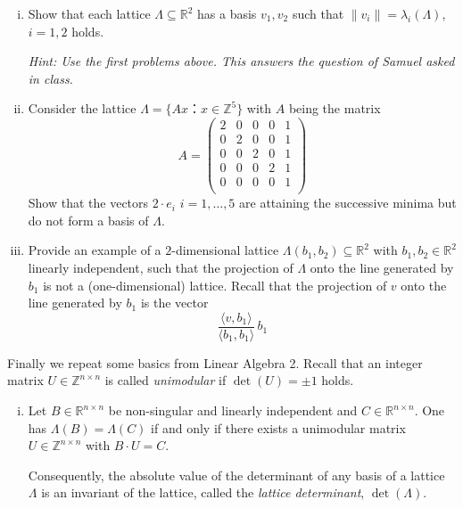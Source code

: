 \documentclass[11pt,a4paper]{article}
\begin{document}
\begin{enumerate}[i)]
  \setcounter{enumi}{\value{carry}} 
\item Show that each lattice $Λ ⊆ ℝ^2$ has a basis $v_1,v_2$ such that $\|v_i\| = λ_i(Λ)$, $i=1,2$  holds.

  \hfill   \emph{Hint: Use the first problems above. This answers the question of Samuel asked in class.}

\item Consider the lattice $    Λ = \{ Ax ： x ∈ℤ^5\} $ with $A$ being the matrix
  \begin{displaymath}
    A =
    \begin{pmatrix}
      2 & 0 & 0 & 0 & 1 \\
      0 & 2 & 0 & 0 & 1 \\
      0 & 0 & 2 & 0 & 1 \\
      0 & 0 & 0 & 2 & 1 \\
      0 & 0 & 0 & 0 & 1 \\
    \end{pmatrix}
  \end{displaymath}
  Show that the vectors $2 ⋅e_i$ $i=1,\dots,5$ are attaining the successive minima but do not form a basis of $Λ$.


\item Provide an example of a $2$-dimensional lattice $Λ(b_1,b_2) ⊆ℝ^2$ with $b_1,b_2 ∈ℝ^2$ linearly independent, such that the projection of $Λ$ onto the line generated by $b_1$ is not a (one-dimensional) lattice.   Recall that the  projection of $v$ onto the line generated by $b_1$ is the vector
  \begin{displaymath}
    \frac{〈v,b_1 〉}{ 〈b_1,b_1 〉}   \,  b_1
  \end{displaymath}
\setcounter{carry}{\value{enumi}}





\end{enumerate} 


\noindent
Finally we repeat some basics from Linear Algebra 2. Recall that an integer matrix $U ∈ℤ^{n ×n}$ is called \emph{unimodular} if $\det(U) = \pm 1$ holds. 


\begin{enumerate}[i)]
  \setcounter{enumi}{\value{carry}} 
\item Let $B ∈ ℝ^{n×n}$ be  non-singular and linearly independent and $C ∈ ℝ^{n×n}$.
  One has $Λ(B ) = Λ(C)$ if and only if there exists a unimodular matrix $U ∈ℤ^{n ×n}$ with $B ⋅U = C$.


  Consequently, the absolute value of the determinant of any basis of a lattice $Λ$ is an invariant of the lattice, called the \emph{lattice determinant}, $\det(Λ)$. 



\end{enumerate}

%
%


 
\end{document}
